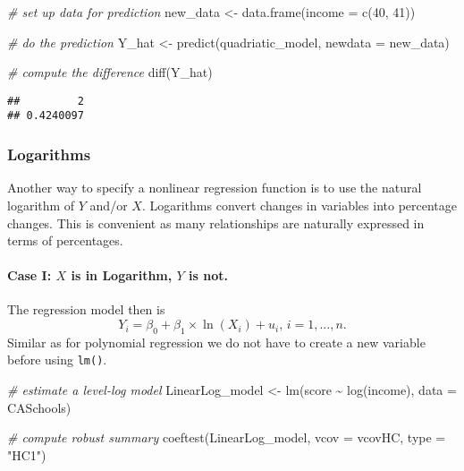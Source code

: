 \documentclass[
]{article}
\newenvironment{Shaded}{\begin{snugshade}}{\end{snugshade}}
\newcommand{\AttributeTok}[1]{\textcolor[rgb]{0.77,0.63,0.00}{#1}}
\newcommand{\CommentTok}[1]{\textcolor[rgb]{0.56,0.35,0.01}{\textit{#1}}}
\newcommand{\DecValTok}[1]{\textcolor[rgb]{0.00,0.00,0.81}{#1}}
\newcommand{\FunctionTok}[1]{\textcolor[rgb]{0.00,0.00,0.00}{#1}}
\newcommand{\NormalTok}[1]{#1}
\newcommand{\OtherTok}[1]{\textcolor[rgb]{0.56,0.35,0.01}{#1}}
\newcommand{\SpecialCharTok}[1]{\textcolor[rgb]{0.00,0.00,0.00}{#1}}
\newcommand{\StringTok}[1]{\textcolor[rgb]{0.31,0.60,0.02}{#1}}
\begin{document}
\begin{Shaded}
\begin{Highlighting}[]
\CommentTok{\# set up data for prediction}
\NormalTok{new\_data }\OtherTok{\textless{}{-}} \FunctionTok{data.frame}\NormalTok{(}\AttributeTok{income =} \FunctionTok{c}\NormalTok{(}\DecValTok{40}\NormalTok{, }\DecValTok{41}\NormalTok{))}

\CommentTok{\# do the prediction}
\NormalTok{Y\_hat }\OtherTok{\textless{}{-}} \FunctionTok{predict}\NormalTok{(quadriatic\_model, }\AttributeTok{newdata =}\NormalTok{ new\_data)}

\CommentTok{\# compute the difference}
\FunctionTok{diff}\NormalTok{(Y\_hat)}
\end{Highlighting}
\end{Shaded}

\begin{verbatim}
##         2 
## 0.4240097
\end{verbatim}

\hypertarget{logarithms}{%
\subsubsection*{Logarithms}\label{logarithms}}

Another way to specify a nonlinear regression function is to use the
natural logarithm of \(Y\) and/or \(X\). Logarithms convert changes in
variables into percentage changes. This is convenient as many
relationships are naturally expressed in terms of percentages.

\hypertarget{case-i-x-is-in-logarithm-y-is-not.}{%
\paragraph*{\texorpdfstring{Case I: \(X\) is in Logarithm, \(Y\) is
not.}{Case I: X is in Logarithm, Y is not.}}\label{case-i-x-is-in-logarithm-y-is-not.}}

The regression model then is
\[Y_i = \beta_0 + \beta_1 \times \ln(X_i) + u_i \text{, } i=1,...,n. \]
Similar as for polynomial regression we do not have to create a new
variable before using \texttt{lm()}.

\begin{Shaded}
\begin{Highlighting}[]
\CommentTok{\# estimate a level{-}log model}
\NormalTok{LinearLog\_model }\OtherTok{\textless{}{-}} \FunctionTok{lm}\NormalTok{(score }\SpecialCharTok{\textasciitilde{}} \FunctionTok{log}\NormalTok{(income), }\AttributeTok{data =}\NormalTok{ CASchools)}

\CommentTok{\# compute robust summary}
\FunctionTok{coeftest}\NormalTok{(LinearLog\_model, }
         \AttributeTok{vcov =}\NormalTok{ vcovHC, }\AttributeTok{type =} \StringTok{"HC1"}\NormalTok{)}
\end{Highlighting}
\end{Shaded}
\end{document}
